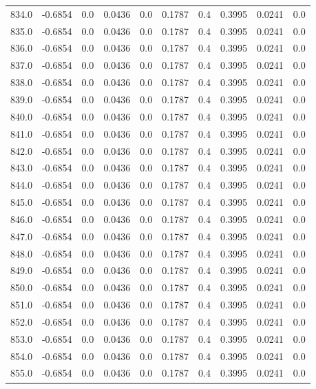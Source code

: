 \begin{longtable}{lrrrrrrrrr}
834.0 & -0.6854 & 0.0 & 0.0436 & 0.0 & 0.1787 & 0.4 & 0.3995 & 0.0241 & 0.0 \\
835.0 & -0.6854 & 0.0 & 0.0436 & 0.0 & 0.1787 & 0.4 & 0.3995 & 0.0241 & 0.0 \\
836.0 & -0.6854 & 0.0 & 0.0436 & 0.0 & 0.1787 & 0.4 & 0.3995 & 0.0241 & 0.0 \\
837.0 & -0.6854 & 0.0 & 0.0436 & 0.0 & 0.1787 & 0.4 & 0.3995 & 0.0241 & 0.0 \\
838.0 & -0.6854 & 0.0 & 0.0436 & 0.0 & 0.1787 & 0.4 & 0.3995 & 0.0241 & 0.0 \\
839.0 & -0.6854 & 0.0 & 0.0436 & 0.0 & 0.1787 & 0.4 & 0.3995 & 0.0241 & 0.0 \\
840.0 & -0.6854 & 0.0 & 0.0436 & 0.0 & 0.1787 & 0.4 & 0.3995 & 0.0241 & 0.0 \\
841.0 & -0.6854 & 0.0 & 0.0436 & 0.0 & 0.1787 & 0.4 & 0.3995 & 0.0241 & 0.0 \\
842.0 & -0.6854 & 0.0 & 0.0436 & 0.0 & 0.1787 & 0.4 & 0.3995 & 0.0241 & 0.0 \\
843.0 & -0.6854 & 0.0 & 0.0436 & 0.0 & 0.1787 & 0.4 & 0.3995 & 0.0241 & 0.0 \\
844.0 & -0.6854 & 0.0 & 0.0436 & 0.0 & 0.1787 & 0.4 & 0.3995 & 0.0241 & 0.0 \\
845.0 & -0.6854 & 0.0 & 0.0436 & 0.0 & 0.1787 & 0.4 & 0.3995 & 0.0241 & 0.0 \\
846.0 & -0.6854 & 0.0 & 0.0436 & 0.0 & 0.1787 & 0.4 & 0.3995 & 0.0241 & 0.0 \\
847.0 & -0.6854 & 0.0 & 0.0436 & 0.0 & 0.1787 & 0.4 & 0.3995 & 0.0241 & 0.0 \\
848.0 & -0.6854 & 0.0 & 0.0436 & 0.0 & 0.1787 & 0.4 & 0.3995 & 0.0241 & 0.0 \\
849.0 & -0.6854 & 0.0 & 0.0436 & 0.0 & 0.1787 & 0.4 & 0.3995 & 0.0241 & 0.0 \\
850.0 & -0.6854 & 0.0 & 0.0436 & 0.0 & 0.1787 & 0.4 & 0.3995 & 0.0241 & 0.0 \\
851.0 & -0.6854 & 0.0 & 0.0436 & 0.0 & 0.1787 & 0.4 & 0.3995 & 0.0241 & 0.0 \\
852.0 & -0.6854 & 0.0 & 0.0436 & 0.0 & 0.1787 & 0.4 & 0.3995 & 0.0241 & 0.0 \\
853.0 & -0.6854 & 0.0 & 0.0436 & 0.0 & 0.1787 & 0.4 & 0.3995 & 0.0241 & 0.0 \\
854.0 & -0.6854 & 0.0 & 0.0436 & 0.0 & 0.1787 & 0.4 & 0.3995 & 0.0241 & 0.0 \\
855.0 & -0.6854 & 0.0 & 0.0436 & 0.0 & 0.1787 & 0.4 & 0.3995 & 0.0241 & 0.0 \\

\end{longtable}
